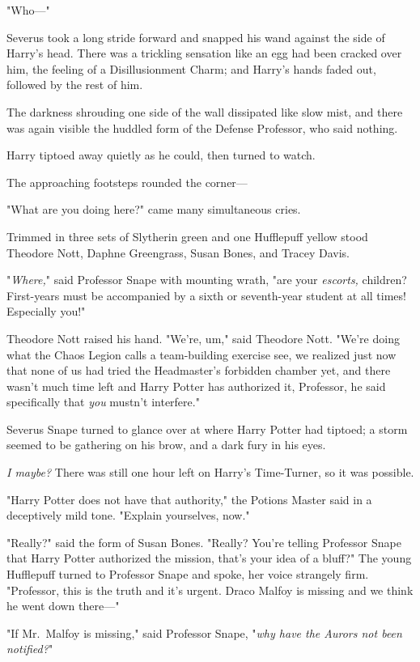 "Who—"

Severus took a long stride forward and snapped his wand against the side of
Harry's head. There was a trickling sensation like an egg had been cracked over
him, the feeling of a Disillusionment Charm; and Harry's hands faded out,
followed by the rest of him.

The darkness shrouding one side of the wall dissipated like slow mist, and
there was again visible the huddled form of the Defense Professor, who said
nothing.

Harry tiptoed away quietly as he could, then turned to watch.

The approaching footsteps rounded the corner—

"What are you doing here?" came many simultaneous cries.

Trimmed in three sets of Slytherin green and one Hufflepuff yellow stood
Theodore Nott, Daphne Greengrass, Susan Bones, and Tracey Davis.

"\emph{Where,}" said Professor Snape with mounting wrath, "are your
\emph{escorts,} children? First-years must be accompanied by a sixth or
seventh-year student at all times! Especially you!"

Theodore Nott raised his hand. "We're, um," said Theodore Nott. "We're doing
what the Chaos Legion calls a team-building exercise{\el} see, we realized
just now that none of us had tried the Headmaster's forbidden chamber yet, and
there wasn't much time left{\el} and Harry Potter has authorized it,
Professor, he said specifically that \emph{you} mustn't interfere."

Severus Snape turned to glance over at where Harry Potter had tiptoed; a storm
seemed to be gathering on his brow, and a dark fury in his eyes.

\emph{I{\el} maybe?} There was still one hour left on Harry's Time-Turner,
so it was possible.

"Harry Potter does not have that authority," the Potions Master said in a
deceptively mild tone. "Explain yourselves, now."

"Really?" said the form of Susan Bones. "Really? You're telling Professor Snape
that Harry Potter authorized the mission, that's your idea of a bluff?" The
young Hufflepuff turned to Professor Snape and spoke, her voice strangely firm.
"Professor, this is the truth and it's urgent. Draco Malfoy is missing and we
think he went down there—"

"If Mr.~Malfoy is missing," said Professor Snape, "\emph{why have the Aurors
not been notified?}"


